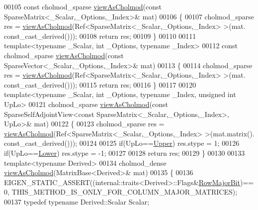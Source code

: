 \begin{DoxyCode}
00105 \textcolor{keyword}{const} cholmod\_sparse \hyperlink{namespace_eigen_ac9fb9e40cfc9ddbdc7da84ee01bb7545}{viewAsCholmod}(\textcolor{keyword}{const} SparseMatrix<\_Scalar,\_Options,\_Index>& mat)
00106 \{
00107   cholmod\_sparse res = \hyperlink{namespace_eigen_ac9fb9e40cfc9ddbdc7da84ee01bb7545}{viewAsCholmod}(Ref<SparseMatrix<\_Scalar,\_Options,\_Index> >(mat.
      const\_cast\_derived()));
00108   \textcolor{keywordflow}{return} res;
00109 \}
00110 
00111 \textcolor{keyword}{template}<\textcolor{keyword}{typename} \_Scalar, \textcolor{keywordtype}{int} \_Options, \textcolor{keyword}{typename} \_Index>
00112 \textcolor{keyword}{const} cholmod\_sparse \hyperlink{namespace_eigen_ac9fb9e40cfc9ddbdc7da84ee01bb7545}{viewAsCholmod}(\textcolor{keyword}{const} SparseVector<\_Scalar,\_Options,\_Index>& mat)
00113 \{
00114   cholmod\_sparse res = \hyperlink{namespace_eigen_ac9fb9e40cfc9ddbdc7da84ee01bb7545}{viewAsCholmod}(Ref<SparseMatrix<\_Scalar,\_Options,\_Index> >(mat.
      const\_cast\_derived()));
00115   \textcolor{keywordflow}{return} res;
00116 \}
00117 
00120 \textcolor{keyword}{template}<\textcolor{keyword}{typename} \_Scalar, \textcolor{keywordtype}{int} \_Options, \textcolor{keyword}{typename} \_Index, \textcolor{keywordtype}{unsigned} \textcolor{keywordtype}{int} UpLo>
00121 cholmod\_sparse \hyperlink{namespace_eigen_ac9fb9e40cfc9ddbdc7da84ee01bb7545}{viewAsCholmod}(\textcolor{keyword}{const} SparseSelfAdjointView<\textcolor{keyword}{const} 
      SparseMatrix<\_Scalar,\_Options,\_Index>, UpLo>& mat)
00122 \{
00123   cholmod\_sparse res = \hyperlink{namespace_eigen_ac9fb9e40cfc9ddbdc7da84ee01bb7545}{viewAsCholmod}(Ref<SparseMatrix<\_Scalar,\_Options,\_Index> >(mat.matrix().
      const\_cast\_derived()));
00124   
00125   \textcolor{keywordflow}{if}(UpLo==\hyperlink{group__enums_gga39e3366ff5554d731e7dc8bb642f83cda6bcb58be3b8b8ec84859ce0c5ac0aaec}{Upper}) res.stype =  1;
00126   \textcolor{keywordflow}{if}(UpLo==\hyperlink{group__enums_gga39e3366ff5554d731e7dc8bb642f83cda891792b8ed394f7607ab16dd716f60e6}{Lower}) res.stype = -1;
00127 
00128   \textcolor{keywordflow}{return} res;
00129 \}
00130 
00133 \textcolor{keyword}{template}<\textcolor{keyword}{typename} Derived>
00134 cholmod\_dense \hyperlink{namespace_eigen_ac9fb9e40cfc9ddbdc7da84ee01bb7545}{viewAsCholmod}(MatrixBase<Derived>& mat)
00135 \{
00136   EIGEN\_STATIC\_ASSERT((internal::traits<Derived>::Flags&\hyperlink{group__flags_gae4f56c2a60bbe4bd2e44c5b19cbe8762}{RowMajorBit})==0,
      THIS\_METHOD\_IS\_ONLY\_FOR\_COLUMN\_MAJOR\_MATRICES);
00137   \textcolor{keyword}{typedef} \textcolor{keyword}{typename} Derived::Scalar Scalar;

\end{DoxyCode}
